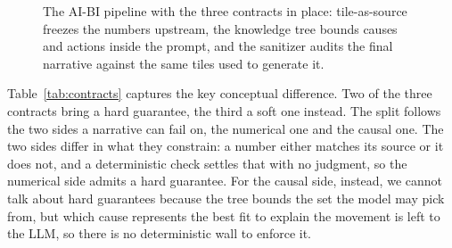 \documentclass[12pt,a4paper,openright,twoside]{book}
\begin{document}
\begin{figure}[htbp]
  \caption{The AI-BI pipeline with the three contracts in place: tile-as-source freezes the numbers upstream, the knowledge tree bounds causes and actions inside the prompt, and the sanitizer audits the final narrative against the same tiles used to generate it.}
  \label{fig:architecture}
  \end{figure}
  

Table~\ref{tab:contracts} captures the key conceptual difference.
Two of the three contracts bring a hard guarantee, the third a soft one instead.
The split follows the two sides a narrative can fail on, the numerical one and the causal one.
The two sides differ in what they constrain: a number either matches its source or it does not, and a deterministic check settles that with no judgment, so the numerical side admits a hard guarantee.
For the causal side, instead, we cannot talk about hard guarantees because the tree bounds the set the model may pick from, but which cause represents the best fit to explain the movement is left to the \ac{LLM}, so there is no deterministic wall to enforce it.
\end{document}
